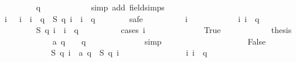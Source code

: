 \begin{isabellebody}
\ \ \ \ \ \ \ \ \isamarkupfalse%
\ {\isacharbackquoteopen}q\ {\isasymge}\ {}{\isacharbackquoteclose}\isanewline
\ \ \ \ \ \ \ \ \isamarkupfalse%
\ {\isacharparenleft}simp\ add{\isacharcolon}\ field{\isacharunderscore}simps{\isacharparenright}\isanewline
\isanewline
\ \ \ \ \ \ \isamarkupfalse%
\ {\isachardoublequoteopen}{\isasymforall}\ i{\isachardot}\ {}\ {\isasymle}\ i\ {\isasymand}\ i\ {\isasymle}\ q\ {\isasymlongrightarrow}\ {\isacharquery}S\ {\isacharparenleft}q{\isacharplus}{}{\isacharparenright}\ i\ {\isacharequal}\ i\ {\isacharminus}\ {}{\isacharslash}q{\isachardoublequoteclose}\isanewline
\ \ \ \ \ \ \isamarkupfalse%
\ safe\isanewline
\ \ \ \ \ \ \ \ \isamarkupfalse%
\ i\isanewline
\ \ \ \ \ \ \ \ \isamarkupfalse%
\ {\isachardoublequoteopen}{}\ {\isasymle}\ i{\isachardoublequoteclose}\ {\isachardoublequoteopen}i\ {\isasymle}\ q{\isachardoublequoteclose}\isanewline
\ \ \ \ \ \ \ \ \isamarkupfalse%
\ {\isachardoublequoteopen}{\isacharquery}S\ {\isacharparenleft}q{\isacharplus}{}{\isacharparenright}\ i\ {\isacharequal}\ i\ {\isacharminus}\ {}{\isacharslash}q{\isachardoublequoteclose}\isanewline
\ \ \ \ \ \ \ \ \isamarkupfalse%
\ {\isacharparenleft}cases\ {\isachardoublequoteopen}i\ {\isacharequal}\ {}{\isachardoublequoteclose}{\isacharparenright}\isanewline
\ \ \ \ \ \ \ \ \ \ \isamarkupfalse%
\ True\isanewline
\ \ \ \ \ \ \ \ \ \ \isamarkupfalse%
\ {\isacharquery}thesis\isanewline
\ \ \ \ \ \ \ \ \ \ \ \ \isamarkupfalse%
\ {\isacharbackquoteopen}a\ q\ {\isacharequal}\ {}\ {\isacharminus}\ {}{\isacharslash}q{\isacharbackquoteclose}\isanewline
\ \ \ \ \ \ \ \ \ \ \ \ \isamarkupfalse%
\ simp\isanewline
\ \ \ \ \ \ \ \ \isamarkupfalse%
\isanewline
\ \ \ \ \ \ \ \ \ \ \isamarkupfalse%
\ False\isanewline
\ \ \ \ \ \ \ \ \ \ \isamarkupfalse%
\ \isamarkupfalse%
\ {\isachardoublequoteopen}{\isacharquery}S\ {\isacharparenleft}q{\isacharplus}{}{\isacharparenright}\ i\ {\isacharequal}\ a\ q\ {\isacharplus}\ {\isacharquery}S\ q\ {\isacharparenleft}i{\isacharminus}{}{\isacharparenright}{\isachardoublequoteclose}\isanewline
\ \ \ \ \ \ \ \ \ \ \ \ \isamarkupfalse%
\ {\isacharbackquoteopen}{}\ {\isasymle}\ i{\isacharbackquoteclose}\ {\isacharbackquoteopen}i\ {\isasymle}\ q{\isacharbackquoteclose}\isanewline

\end{isabellebody}
